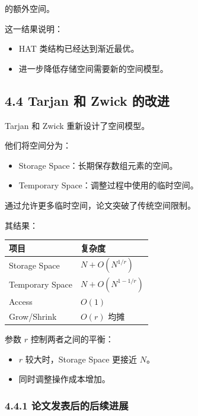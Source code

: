 \documentclass[
  UTF8,
  a4paper,
  12pt]{ctexart}
\newcounter{none} %
\providecommand{\tightlist}{%
  \setlength{\itemsep}{0pt}\setlength{\parskip}{0pt}}
\begin{document}
的额外空间。

这一结果说明：

\begin{itemize}
\tightlist
\item
  HAT 类结构已经达到渐近最优。
\item
  进一步降低存储空间需要新的空间模型。
\end{itemize}

\subsection{4.4 Tarjan 和 Zwick
的改进}\label{tarjan-ux548c-zwick-ux7684ux6539ux8fdb}

Tarjan 和 Zwick 重新设计了空间模型。

他们将空间分为：

\begin{itemize}
\tightlist
\item
  Storage Space：长期保存数组元素的空间。
\item
  Temporary Space：调整过程中使用的临时空间。
\end{itemize}

通过允许更多临时空间，论文突破了传统空间限制。

其结果：

{\def\LTcaptype{none} %
\begin{longtable}[]{@{}ll@{}}
\toprule\noalign{}
项目 & 复杂度 \\
\midrule\noalign{}
\endhead
\bottomrule\noalign{}
\endlastfoot
Storage Space & \(N+O(N^{1/r})\) \\
Temporary Space & \(N+O(N^{1-1/r})\) \\
Access & \(O(1)\) \\
Grow/Shrink & \(O(r)\) 均摊 \\
\end{longtable}
}

参数 \(r\) 控制两者之间的平衡：

\begin{itemize}
\tightlist
\item
  \(r\) 较大时，Storage Space 更接近 \(N\)。
\item
  同时调整操作成本增加。
\end{itemize}

\subsubsection{4.4.1
论文发表后的后续进展}\label{ux8bbaux6587ux53d1ux8868ux540eux7684ux540eux7eedux8fdbux5c55}
\end{document}
